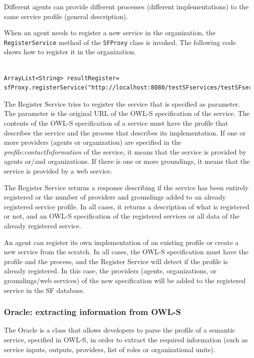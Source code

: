 Different agents can provide different processes (different implementations) to the same service profile (general description).

When an agent needs to register a new service in the organization, the \lstinline|RegisterService| method of the \lstinline|SFProxy| class is invoked. The following code shows how to register it in the organization.

\begin{lstlisting}

ArrayList<String> resultRegister= sfProxy.registerService("http://localhost:8080/testSFservices/testSFservices/owl/owls/Addition.owl");

\end{lstlisting}

\vspace{1cm}

The Register Service tries to register the service that is specified as parameter. The parameter is the original URL of the OWL-S specification of the service. The contents of the OWL-S specification of a service must have the profile that describes the service and the process that describes its implementation. If one or more providers (agents or organization) are specified in the \textit{profile:contactInformation} of the service, it means that the service is provided by agents or/and organizations. If there is one or more groundings, it means that the service is provided by a web service.


The Register Service returns a response describing if the service has been entirely registered or the number of providers and groundings added to an already registered service profile. In all cases, it returns a description of what is registered or not, and an OWL-S specification of the registered services or all data of the already registered service.



An agent can register its own implementation of an existing profile or create a new service from the scratch. In all cases, the OWL-S specification must have the profile and the process, and the Register Service will detect if the profile is already registered. In this case, the providers (agents, organizations, or groundings/web services) of the new specification will be added to the registered service in the SF database.


\subsubsection{Oracle: extracting information from OWL-S}
The Oracle is a class that allows developers to parse the profile of a semantic service, specified in OWL-S, in order to extract the required information (such as service inputs, outputs, providers, list of roles or organizational units).

